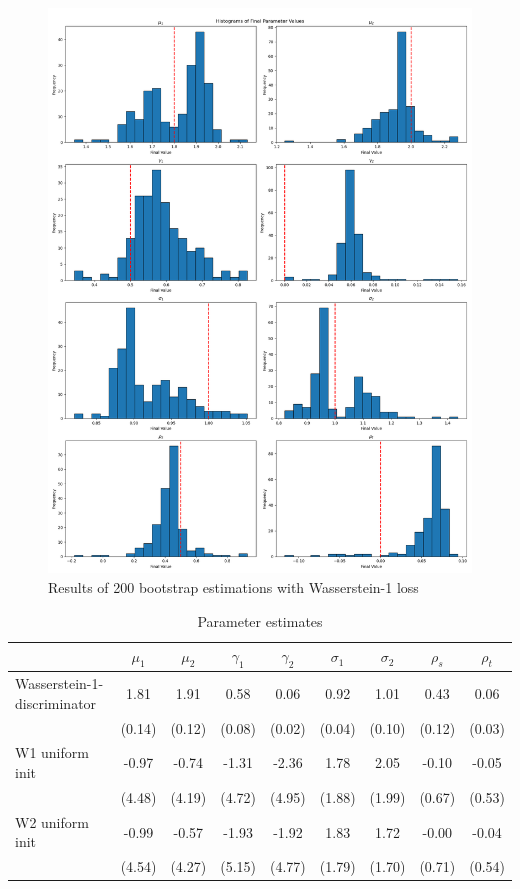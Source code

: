 \begin{figure}
    \includegraphics[width=\textwidth]{./Images/main_case_histograms.png}
    \caption{Results of 200 bootstrap estimations with Wasserstein-1 loss}
    \label{fig:main_case_histrograms}
\end{figure}

\begin{table}
    \centering
    \begin{tabular}{|l|cccccccc} %
    \hline
    & $\mu_1$ & $\mu_2$ & $\gamma_1$ & $\gamma_2$ & $\sigma_1$ & $\sigma_2$ & $\rho_s$ & $\rho_t$ \\
    \hline
    Wasserstein-1-discriminator & 1.81 & 1.91 & 0.58 & 0.06 & 0.92 & 1.01 & 0.43 & 0.06 \\
    & (0.14) & (0.12) & (0.08) & (0.02) & (0.04) & (0.10) & (0.12) & (0.03) \\
    \hline
    W1 uniform init & -0.97 & -0.74 & -1.31 & -2.36 & 1.78 & 2.05 & -0.10 & -0.05 \\
    & (4.48) & (4.19) & (4.72) & (4.95) & (1.88) & (1.99) & (0.67) & (0.53) \\
    \hline
    W2 uniform init & -0.99 & -0.57 & -1.93 & -1.92 & 1.83 & 1.72 & -0.00 & -0.04 \\
    & (4.54) & (4.27) & (5.15) & (4.77) & (1.79) & (1.70) & (0.71) & (0.54) \\
    \end{tabular}
    \caption{Parameter estimates}
    \label{tab:parameter_estimates}
\end{table}

